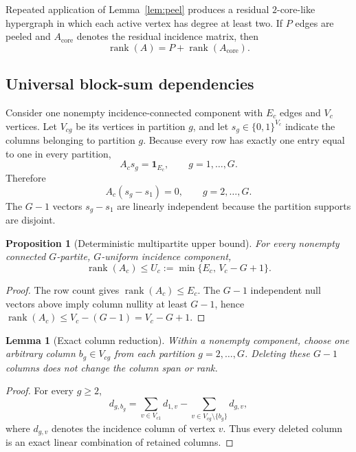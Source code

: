 \documentclass[11pt]{article}
\newtheorem{proposition}[theorem]{Proposition}
\newtheorem{lemma}[theorem]{Lemma}
\theoremstyle{definition}
\newcommand{\rank}{\operatorname{rank}}
\newcommand{\1}{\mathbf{1}}
\begin{document}
Repeated application of Lemma~\ref{lem:peel} produces a residual $2$-core-like hypergraph in which each active vertex has degree at least two. If $P$ edges are peeled and $A_{\mathrm{core}}$ denotes the residual incidence matrix, then
\begin{equation}
  \rank(A)=P+\rank(A_{\mathrm{core}}).
  \label{eq:peelcore}
\end{equation}

\subsection{Universal block-sum dependencies}

Consider one nonempty incidence-connected component with $E_c$ edges and $V_c$ vertices. Let $V_{cg}$ be its vertices in partition $g$, and let $s_g\in\{0,1\}^{V_c}$ indicate the columns belonging to partition $g$. Because every row has exactly one entry equal to one in every partition,
\begin{equation}
  A_c s_g=\1_{E_c}, \qquad g=1,\ldots,G.
\end{equation}
Therefore
\begin{equation}
  A_c(s_g-s_1)=0, \qquad g=2,\ldots,G.
\end{equation}
The $G-1$ vectors $s_g-s_1$ are linearly independent because the partition supports are disjoint.

\begin{proposition}[Deterministic multipartite upper bound]\label{prop:upper}
For every nonempty connected $G$-partite, $G$-uniform incidence component,
\begin{equation}
  \rank(A_c)\le U_c:=\min\{E_c,\,V_c-G+1\}.
  \label{eq:upper}
\end{equation}
\end{proposition}

\begin{proof}
The row count gives $\rank(A_c)\le E_c$. The $G-1$ independent null vectors above imply column nullity at least $G-1$, hence $\rank(A_c)\le V_c-(G-1)=V_c-G+1$.
\end{proof}

\begin{lemma}[Exact column reduction]\label{lem:blockdrop}
Within a nonempty component, choose one arbitrary column $b_g\in V_{cg}$ from each partition $g=2,\ldots,G$. Deleting these $G-1$ columns does not change the column span or rank.
\end{lemma}

\begin{proof}
For every $g\ge2$,
\begin{equation}
  d_{g,b_g}
  =\sum_{v\in V_{c1}}d_{1,v}
   -\sum_{v\in V_{cg}\setminus\{b_g\}}d_{g,v},
\end{equation}
where $d_{g,v}$ denotes the incidence column of vertex $v$. Thus every deleted column is an exact linear combination of retained columns.
\end{proof}
\end{document}
